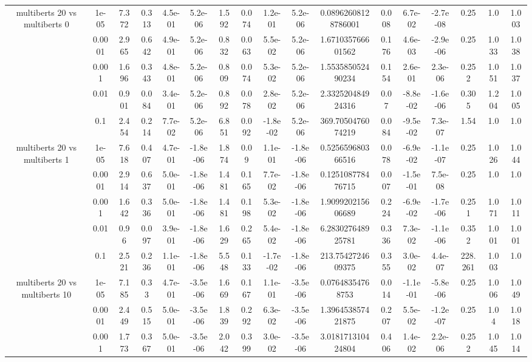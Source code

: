 \begin{tabular}{|c|c|c|c|c|c|c|c|c|c|c|c|c|c|c|c|c|}
\hline
\multirow{5}{*}{multiberts 20 vs multiberts 0} & 1e-05 & 7.372 & 0.313 & 4.5e-01 & 5.2e-06 & 1.592 & 0.074 & 1.2e-01 & 5.2e-06 & 0.08962608128786001 & 0.008 & 6.7e-02 & -2.7e-08 & 0.25 & 1.0 & 1.003 \\
 & 0.0001 & 2.965 & 0.642 & 4.9e-01 & 5.2e-06 & 0.832 & 0.063 & 5.5e-02 & 5.2e-06 & 1.671035766601562 & 0.176 & 4.6e-03 & -2.9e-06 & 0.25 & 1.033 & 1.038 \\
 & 0.001 & 1.696 & 0.343 & 4.8e-01 & 5.2e-06 & 0.809 & 0.074 & 5.3e-02 & 5.2e-06 & 1.553585052490234 & 0.154 & 2.6e-01 & 2.3e-06 & 0.252 & 1.051 & 1.037 \\
 & 0.01 & 0.901 & 0.084 & 3.4e-01 & 5.2e-06 & 0.892 & 0.078 & 2.8e-02 & 5.2e-06 & 2.332520484924316 & 0.07 & -8.8e-02 & -1.6e-06 & 0.305 & 1.204 & 1.005 \\
 & 0.1 & 2.454 & 0.214 & 7.7e-02 & 5.2e-06 & 6.851 & 0.092 & -1.8e-02 & 5.2e-06 & 369.7050476074219 & 0.084 & -9.5e-02 & 7.3e-07 & 1.54 & 1.0 & 1.0 \\
\hline
\multirow{5}{*}{multiberts 20 vs multiberts 1} & 1e-05 & 7.618 & 0.407 & 4.7e-01 & -1.8e-06 & 1.874 & 0.09 & 1.1e-01 & -1.8e-06 & 0.525659680366516 & 0.078 & -6.9e-02 & -1.1e-07 & 0.25 & 1.026 & 1.044 \\
 & 0.0001 & 2.914 & 0.637 & 5.0e-01 & -1.8e-06 & 1.481 & 0.165 & 7.7e-02 & -1.8e-06 & 0.125108778476715 & 0.007 & -1.5e-01 & 7.5e-08 & 0.25 & 1.0 & 1.0 \\
 & 0.001 & 1.642 & 0.336 & 5.0e-01 & -1.8e-06 & 1.481 & 0.198 & 5.3e-02 & -1.8e-06 & 1.909920215606689 & 0.224 & -6.9e-02 & -1.7e-06 & 0.251 & 1.071 & 1.011 \\
 & 0.01 & 0.96 & 0.097 & 3.9e-01 & -1.8e-06 & 1.629 & 0.265 & 5.4e-02 & -1.8e-06 & 6.283027648925781 & 0.336 & 7.3e-02 & -1.1e-06 & 0.352 & 1.001 & 1.001 \\
 & 0.1 & 2.521 & 0.236 & 1.1e-01 & -1.8e-06 & 5.548 & 0.133 & -1.7e-02 & -1.8e-06 & 213.7542724609375 & 0.355 & 3.0e-02 & 4.4e-07 & 228.261 & 1.003 & 1.0 \\
\hline
\multirow{5}{*}{multiberts 20 vs multiberts 10} & 1e-05 & 7.185 & 0.33 & 4.7e-01 & -3.5e-06 & 1.669 & 0.167 & 1.1e-01 & -3.5e-06 & 0.07648354768753 & 0.014 & -1.1e-01 & -5.8e-06 & 0.25 & 1.006 & 1.049 \\
 & 0.0001 & 2.449 & 0.515 & 5.0e-01 & -3.5e-06 & 1.839 & 0.292 & 6.3e-02 & -3.5e-06 & 1.396453857421875 & 0.207 & 5.5e-02 & -1.2e-07 & 0.25 & 1.04 & 1.018 \\
 & 0.001 & 1.773 & 0.367 & 5.0e-01 & -3.5e-06 & 2.042 & 0.399 & 3.0e-02 & -3.5e-06 & 3.018171310424804 & 0.406 & 1.4e-02 & 2.2e-06 & 0.252 & 1.045 & 1.014 \\

\end{tabular}
